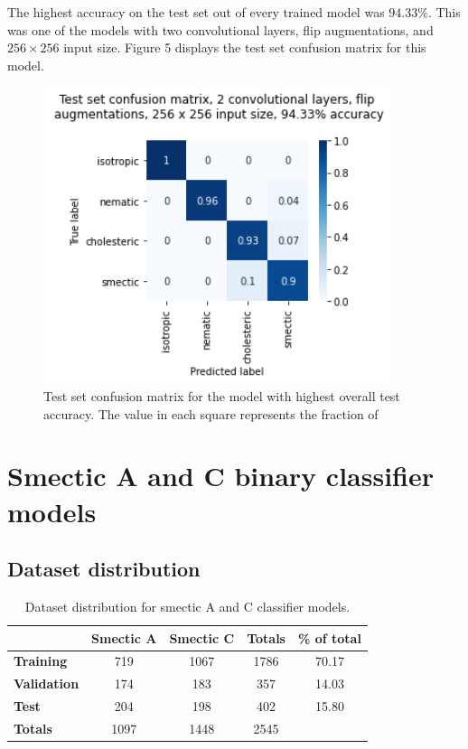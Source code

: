 \documentclass[12pt]{article}
\begin{document}
The highest accuracy on the test set out of every trained model was $94.33\%$. This was one of the models with two convolutional layers, flip augmentations, and $256 \times 256$ input size. Figure 5 displays the test set confusion matrix for this model.
\begin{figure}[h]
	\centering
    \includegraphics[width=4in]{images/confusion_matrix.png}
    \caption{Test set confusion matrix for the model with highest overall test accuracy. The value in each square represents the fraction of }
\end{figure} 
\section{Smectic A and C binary classifier models}
\subsection{Dataset distribution}
\begin{table}[h]
\begin{center}
\caption{Dataset distribution for smectic A and C classifier models.}
\begin{tabular}{l|c|c|c|c}
\toprule
& \textbf{Smectic A} & \textbf{Smectic C} & \textbf{Totals} & \textbf{\% of total}\\
\midrule
\textbf{Training} & 719 & 1067 & 1786 & 70.17\\
\textbf{Validation} & 174 & 183 & 357 & 14.03\\
\textbf{Test} & 204 & 198 & 402 & 15.80\\
\midrule
\textbf{Totals} & 1097 & 1448 & 2545\\
\bottomrule
\end{tabular}
\end{center}
\end{table}
\end{document}

